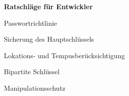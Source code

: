 \begin{frame}
	\centering
	\textbf{Ratschläge für Entwickler}
	\begin{block}{}
		Passwortrichtlinie
	\end{block}
	\begin{block}{}
		Sicherung des Hauptschlüssels
	\end{block}
	\begin{block}{}
		Lokations- und Tempusberücksichtigung
	\end{block}
	\begin{block}{}
		Bipartite Schlüssel
	\end{block}
	\begin{block}{}
		Manipulationsschutz
	\end{block}
\end{frame}